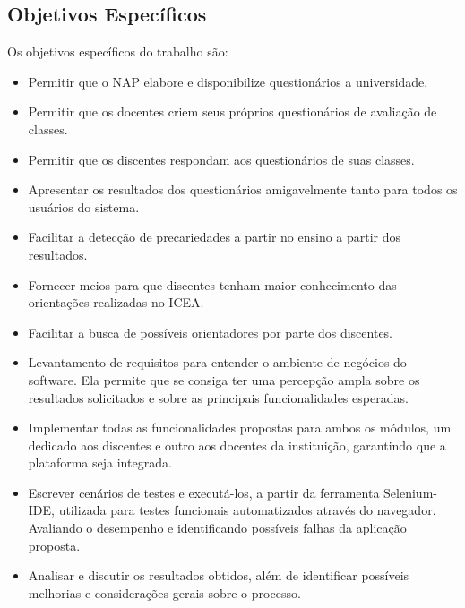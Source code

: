 \documentclass[
  12pt,       %
  openright,      %
  oneside,      %
  a4paper,      %
  english,      %
  french,        %
  spanish,     %
  brazil        %
  ]{abntex2-decsi}
\begin{document}
        \subsection{Objetivos Específicos}
        
        


            Os objetivos específicos do trabalho são:
      
            \begin{itemize}
            	\item Permitir que o NAP elabore e disponibilize questionários a universidade.
                \item Permitir que os docentes criem seus próprios questionários de avaliação de classes.
                \item Permitir que os discentes respondam aos questionários de suas classes.
                \item Apresentar os resultados dos questionários amigavelmente tanto para todos os usuários do sistema.
                \item Facilitar a detecção de precariedades a partir no ensino a partir dos resultados.
                \item Fornecer meios para que discentes tenham maior conhecimento das orientações realizadas no ICEA.
                \item Facilitar a busca de possíveis orientadores por parte dos discentes.
                
                
            
\item Levantamento de requisitos para entender o ambiente de negócios do software. Ela permite que se consiga ter uma percepção ampla sobre os resultados solicitados e sobre as principais funcionalidades esperadas.

\item Implementar todas as funcionalidades propostas para ambos os módulos, um dedicado aos discentes e outro aos docentes da instituição, garantindo que a plataforma seja integrada.

\item Escrever cenários de testes e executá-los, a partir da ferramenta Selenium-IDE, utilizada para testes funcionais automatizados através do navegador. Avaliando o desempenho e identificando possíveis falhas da aplicação proposta. 

\item Analisar e discutir os resultados obtidos, além de identificar possíveis melhorias e considerações gerais sobre o processo.
            \end{itemize}
\end{document}
